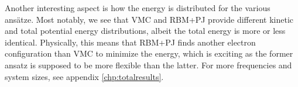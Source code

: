 Another interesting aspect is how the energy is distributed for the various ansätze. Most notably, we see that VMC and RBM+PJ provide different kinetic and total potential energy distributions, albeit the total energy is more or less identical. Physically, this means that RBM+PJ finds another electron configuration than VMC to minimize the energy, which is exciting as the former ansatz is supposed to be more flexible than the latter. For more frequencies and system sizes, see appendix \ref{chp:totalresults}.

\begin{figure}
	\centering
	\captionsetup[subfigure]{labelformat=empty}
	\hspace{0.1cm}
	\hspace{-0.cm}
	\hspace{-0.cm}
	\\ [-0.cm]
	

\end{figure}
